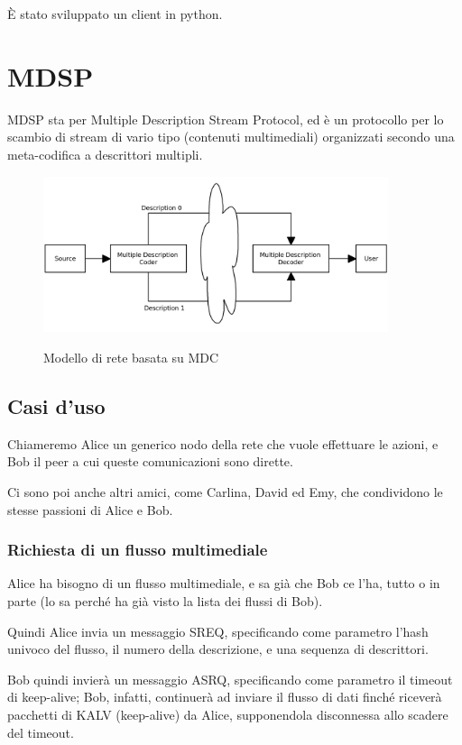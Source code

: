 \`E stato sviluppato un client in python.



\section{MDSP}


MDSP sta per Multiple Description Stream Protocol, ed è un protocollo per lo
scambio di stream di vario tipo (contenuti multimediali) organizzati secondo una
meta-codifica a descrittori multipli.

\begin{figure}[b]
\includegraphics[width=0.90\textwidth]{../images/network_mdc.png}
\label{fig:network_mdc}
\caption{Modello di rete basata su MDC}
\end{figure}

\subsection{Casi d'uso}


Chiameremo Alice un generico nodo della rete che vuole effettuare le azioni, e
Bob il peer a cui queste comunicazioni sono dirette.

Ci sono poi anche altri amici, come Carlina, David ed Emy, che condividono le
stesse passioni di Alice e Bob.


\subsubsection{Richiesta di un flusso multimediale}
%

Alice ha bisogno di un flusso multimediale, e sa già che Bob ce l'ha, tutto o in
parte (lo sa perché ha già visto la lista dei flussi di Bob).

Quindi Alice invia un messaggio SREQ, specificando come parametro l'hash univoco
del flusso, il numero della descrizione, e una sequenza di descrittori.

Bob quindi invierà un messaggio ASRQ, specificando come parametro il timeout di
keep-alive; Bob, infatti, continuerà ad inviare il flusso di dati finché riceverà
pacchetti di KALV (keep-alive) da Alice, supponendola disconnessa allo scadere
del timeout.






